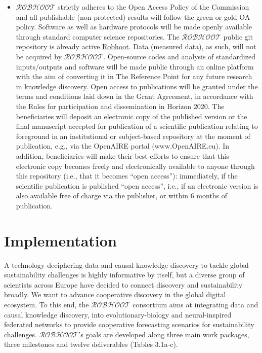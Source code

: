 \documentclass[11pt, a4paper]{article} %
\begin{document}
\begin{itemize}
\item $\mathcal{ROBHOOT}$ strictly adheres to the Open Access Policy
  of the Commission and all publishable (non-protected) results will
  follow the green or gold OA policy. Software as well as hardware
  protocols will be made openly available through standard computer
  science repositories. The $\mathcal{ROBHOOT}$ public git repository
  is already active
  \href{https://github.com/RobhooX/Robhoot}{Robhoot}. Data (measured
  data), as such, will not be acquired by
  $\mathcal{ROBHOOT}$. Open-source codes and analysis of standardized
  inputs/outputs and software will be made public through an online
  platform with the aim of converting it in The Reference Point for
  any future research in knowledge discovery. Open access to
  publications will be granted under the terms and conditions laid
  down in the Grant Agreement, in accordance with the Rules for
  participation and dissemination in Horizon 2020. The beneficiaries
  will deposit an electronic copy of the published version or the
  final manuscript accepted for publication of a scientific
  publication relating to foreground in an institutional or
  subject-based repository at the moment of publication, e.g., via the
  OpenAIRE portal (www.OpenAIRE.eu). In addition, beneficiaries will
  make their best efforts to ensure that this electronic copy becomes
  freely and electronically available to anyone through this
  repository (i.e., that it becomes “open access”): immediately, if
  the scientific publication is published “open access”, i.e., if an
  electronic version is also available free of charge via the
  publisher, or within 6 months of publication.
  \end{itemize}

\section{Implementation}

A technology deciphering data and causal knowledge discovery to tackle
global sustainability challenges is highly informative by itself, but
a diverse group of scientists across Europe have decided to connect
discovery and sustainability broadly. We want to advance cooperative
discovery in the global digital ecosystem. To this end, the
$\mathcal{ROBHOOT}$ consortium aims at integrating data and causal
knowledge discovery, into evolutionary-biology and neural-inspired
federated networks to provide cooperative forecasting scenarios for
sustainability challenges. $\mathcal{ROBHOOT}$'s goals are developed
along three main work packages, three milestones and twelve
deliverables (Tables 3.1a-c).
\end{document}
